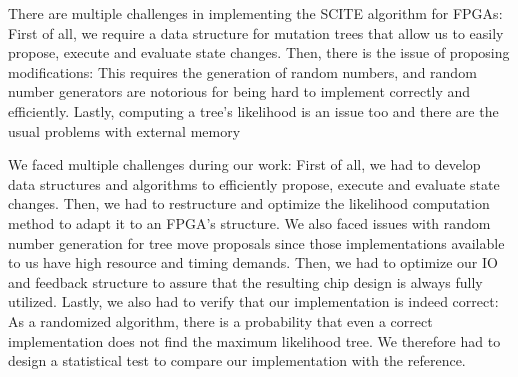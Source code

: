 There are multiple challenges in implementing the \ac{SCITE} algorithm for \acp{FPGA}: First of all, we require a data structure for mutation trees that allow us to easily propose, execute and evaluate state changes. Then, there is the issue of proposing modifications: This requires the generation of random numbers, and random number generators are notorious for being hard to implement correctly and efficiently. Lastly, computing a tree's likelihood is an issue too and there are the usual problems with external memory 

We faced multiple challenges during our work: First of all, we had to develop data structures and algorithms to efficiently propose, execute and evaluate state changes. Then, we had to restructure and optimize the likelihood computation method to adapt it to an \ac{FPGA}'s structure. We also faced issues with random number generation for tree move proposals since those implementations available to us have high resource and timing demands. Then, we had to optimize our IO and feedback structure to assure that the resulting chip design is always fully utilized. Lastly, we also had to verify that our implementation is indeed correct: As a randomized algorithm, there is a probability that even a correct implementation does not find the maximum likelihood tree. We therefore had to design a statistical test to compare our implementation with the reference.